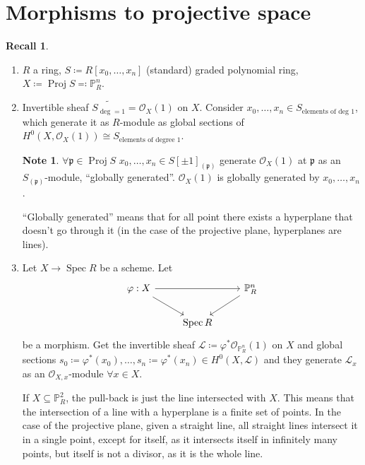 \documentclass[12pt]{article}
\DeclareMathOperator{\Spec}{Spec}
\DeclareMathOperator{\Proj}{Proj}
\theoremstyle{definition}
\newtheorem*{note}{Note}
\newtheorem*{recall}{Recall}
\begin{document}
\section{Morphisms to projective space}
\begin{recall}
\begin{enumerate}[label=\arabic*)]
\item $R$ a ring, $S\coloneqq R[x_0,\ldots,x_n]$ (standard) graded polynomial ring, $X\coloneqq\Proj S\eqqcolon\mathbb{P}_R^n$.

\item Invertible sheaf $\widetilde{S_{\deg=1}}=\mathcal{O}_X(1)$ on $X$. Consider $x_0,\ldots,x_n\in S_{\text{elements of deg }1}$, which generate it as $R$-module as global sections of $H^0(X,\mathcal{O}_X(1))\cong S_{\text{elements of degree }1}$.

\begin{note}
$\forall\mathfrak{p}\in\Proj S$ $x_0,\ldots,x_n\in S[\pm1]_{(\mathfrak{p})}$ generate $\mathcal{O}_X(1)$ at $\mathfrak{p}$ as an $S_{(\mathfrak{p})}$-module, ``globally generated''. $\mathcal{O}_X(1)$ is globally generated by $x_0,\ldots,x_n$.
\end{note}

``Globally generated'' means that for all point there exists a hyperplane that doesn't go through it (in the case of the projective plane, hyperplanes are lines).

\item Let $X\rightarrow\Spec R$ be a scheme. Let
\[
\begin{tikzcd}
\varphi:X\arrow[rr]\arrow[rd]&&\mathbb{P}_R^n\arrow[ld]\\
&\Spec R
\end{tikzcd}
\]
be a morphism. Get the invertible sheaf $\mathcal{L}\coloneqq\varphi^*\mathcal{O}_{\mathbb{P}_R^n}(1)$ on $X$ and global sections $s_0\coloneqq\varphi^*(x_0),\ldots,s_n\coloneqq\varphi^*(x_n)\in H^0(X,\mathcal{L})$ and they generate $\mathcal{L}_x$ as an $\mathcal{O}_{X,x}$-module $\forall x\in X$.

If $X\subseteq\mathbb{P}_R^2$, the pull-back is just the line intersected with $X$. This means that the intersection of a line with a hyperplane is a finite set of points. In the case of the projective plane, given a straight line, all straight lines intersect it in a single point, except for itself, as it intersects itself in infinitely many points, but itself is not a divisor, as it is the whole line.
\end{enumerate}
\end{recall}
\end{document}
